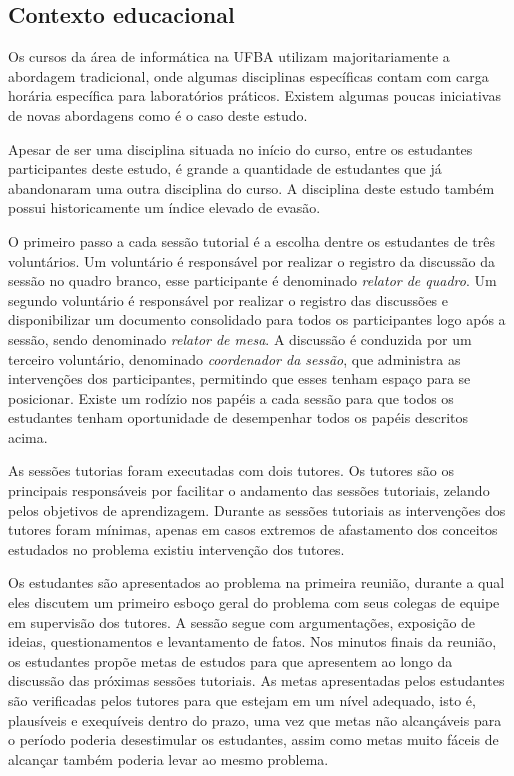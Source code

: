 \subsection{Contexto educacional}
\label{sec-contexto-educacional}
Os cursos da área de informática na \ac{UFBA}
utilizam majoritariamente a abordagem tradicional, onde
algumas disciplinas específicas contam com carga horária específica
para laboratórios práticos.
Existem algumas poucas iniciativas de novas abordagens como é
o caso deste estudo.

Apesar de ser uma disciplina situada no início do
curso, entre os estudantes participantes deste estudo,
é grande a quantidade de estudantes que já abandonaram uma
outra disciplina do curso.
A disciplina deste estudo também possui historicamente um índice
elevado de evasão.

O primeiro passo a cada sessão tutorial é a escolha dentre os
estudantes de três voluntários.
Um voluntário é responsável por realizar o registro da discussão
da sessão no quadro branco, esse
participante é denominado \textit{relator de quadro}.
Um segundo voluntário é responsável por realizar o registro
das discussões e disponibilizar um documento consolidado para todos
os participantes logo após
a sessão, sendo denominado \textit{relator de mesa}.
A discussão é conduzida por um terceiro voluntário,
denominado \textit{coordenador da sessão}, que administra
as intervenções dos participantes, permitindo que esses
tenham espaço para se posicionar.
Existe um rodízio nos papéis a cada sessão para que todos
os estudantes tenham oportunidade de desempenhar todos
os papéis descritos acima.

As sessões tutorias foram executadas com dois tutores.
Os tutores são os principais responsáveis por facilitar o andamento
das sessões tutoriais, zelando pelos objetivos de aprendizagem.
Durante as sessões tutoriais as intervenções dos tutores
foram mínimas, apenas em casos extremos de
afastamento dos conceitos estudados no problema existiu intervenção dos tutores.

Os estudantes são apresentados ao problema na primeira reunião, durante
a qual eles discutem um primeiro esboço geral do problema com seus
colegas de equipe em supervisão dos tutores.
A sessão segue com argumentações, exposição de ideias,
questionamentos e levantamento de fatos.
Nos minutos finais da reunião, os estudantes propõe metas de estudos para
que apresentem ao longo da discussão das próximas sessões tutoriais.
As metas apresentadas pelos estudantes são verificadas pelos tutores
para que estejam em um nível adequado, isto é, plausíveis e exequíveis
dentro do prazo, uma vez que metas não
alcançáveis para o período poderia desestimular os estudantes, assim
como metas muito fáceis de alcançar também poderia levar
ao mesmo problema.

